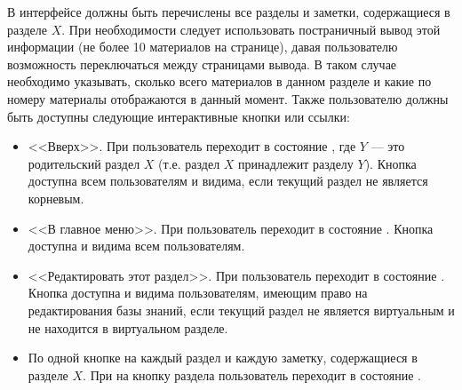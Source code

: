 \begin{enumerate}
                В интерфейсе должны быть перечислены все разделы и заметки, содержащиеся в разделе
                \(X\). При необходимости следует использовать постраничный вывод этой информации
                (не более 10 материалов на странице), давая пользователю возможность переключаться
                между страницами вывода. В таком случае необходимо указывать, сколько всего материалов
                в данном разделе и какие по номеру материалы отображаются в данный момент.
                Также пользователю должны быть доступны следующие интерактивные кнопки или ссылки:
                \begin{itemize}
                    \item
                        <<Вверх>>.
                        При  пользователь переходит в состояние
                        \hyperref[itm:req:ui:states:navx]
                        {}, где \(Y\)
                        --- это родительский раздел \(X\) (т.е. раздел \(X\) принадлежит
                        разделу \(Y\)).
                        Кнопка доступна всем пользователям и видима, если текущий раздел
                        не является корневым.
                    \item
                        <<В главное меню>>.
                        При  пользователь переходит в состояние
                        \hyperref[itm:req:ui:states:mainmenu]
                        {}.
                        Кнопка доступна и видима всем пользователям.
                    \item
                        <<Редактировать этот раздел>>.
                        При  пользователь переходит в состояние
                        \hyperref[itm:req:ui:states:edit-section]
                        {}.
                        Кнопка доступна и видима пользователям, имеющим право на редактирования базы знаний,
                        если текущий раздел не является виртуальным и не находится в виртуальном разделе.
                    \item
                        По одной кнопке на каждый раздел и каждую заметку, содержащиеся в разделе \(X\).
                        При  на кнопку раздела пользователь переходит в состояние
                        \hyperref[itm:req:ui:states:navx]
                        {}.

\end{itemize}
\end{enumerate}
